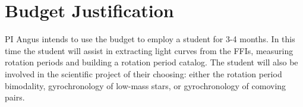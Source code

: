 \documentclass[useAMS, usenatbib, preprint, 12pt]{aastex}
\begin{document}
\section{Budget Justification}
PI Angus intends to use the budget to employ a student for 3-4 months.
In this time the student will assist in extracting light curves from the FFIs,
measuring rotation periods and building a rotation period catalog.
The student will also be involved in the scientific project of their choosing:
either the rotation period bimodality, gyrochronology of low-mass stars, or
gyrochronology of comoving pairs.


\end{document}
